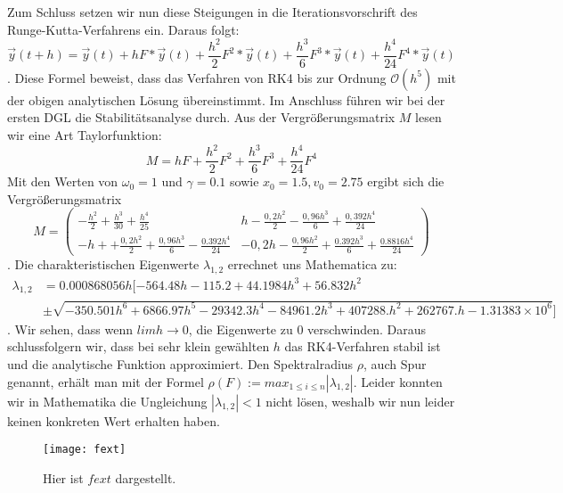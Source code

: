 \documentclass[ngerman]{scrartcl}
\begin{document}
Zum Schluss setzen wir nun diese Steigungen in die Iterationsvorschrift des Runge-Kutta-Verfahrens ein. Daraus folgt: \begin{equation} \vec{y}(t+h) = \vec{y}(t) + hF*\vec{y}(t) + \frac{h^2}{2}F^2*\vec{y}(t) + \frac{h^3}{6}F^3*\vec{y}(t) + \frac{h^4}{24}F^4*\vec{y}(t) \end{equation}. Diese Formel beweist, dass das Verfahren von RK4 bis zur Ordnung $\mathcal{O}(h^5)$ mit der obigen analytischen Lösung übereinstimmt. \newline
Im Anschluss führen wir bei der ersten DGL die Stabilitätsanalyse durch. Aus der Vergrößerungsmatrix $M$ lesen wir eine Art Taylorfunktion: \begin{equation*} M = hF + \frac{h^2}{2}F^2 + \frac{h^3}{6}F^3 + \frac{h^4}{24}F^4 \end{equation*}
Mit den Werten von $\omega_{0}=1$ und $\gamma=0.1$ sowie $x_{0}=1.5, v_{0}=2.75$  ergibt sich die Vergrößerungsmatrix \begin{equation} M = \begin{pmatrix} -\frac{h^2}{2}+\frac{h^3}{30}+\frac{h^4}{25} & h-\frac{0,2h^2}{2} - \frac{0,96h^3}{6} + \frac{0,392h^4}{24}\\  -h++\frac{0,2h^2}{2} + \frac{0,96h^3}{6} - \frac{0.392h^4}{24} & -0,2h-\frac{0,96h^2}{2} + \frac{0.392h^3}{6} + \frac{0.8816h^4}{24}  \end{pmatrix}\end{equation}.
Die charakteristischen Eigenwerte $\lambda_{1,2}$ errechnet uns Mathematica zu: \begin{align*}  \lambda_{1,2} &=0.000868056 h [-564.48 h-115.2+44.1984 h^3+56.832 h^2 \\  & \pm \sqrt{-350.501 h^6+6866.97 h^5-29342.3 h^4-84961.2 h^3+407288.h^2+262767. h-1.31383\times 10^6}]  \end{align*}. Wir sehen, dass wenn $lim {h \to 0}$, die Eigenwerte zu 0 verschwinden. Daraus schlussfolgern wir, dass bei sehr klein gewählten $h$ das RK4-Verfahren stabil ist und die analytische Funktion approximiert. Den Spektralradius $\rho$, auch Spur genannt, erhält man mit der Formel $\rho(F):=max_{1 \leq i  \leq n} |\lambda_{1,2}|$. Leider konnten wir in Mathematika die Ungleichung $|\lambda_{1,2}| < 1$ nicht lösen, weshalb wir nun leider keinen konkreten Wert erhalten haben.
	\begin{figure}[htbp]
		\centering
		\texttt{[image: fext]}
		\caption[$f{ext}$]{Hier ist $f{ext}$ dargestellt.}
		\label{fig:fext}
	\end{figure}
\end{document}
